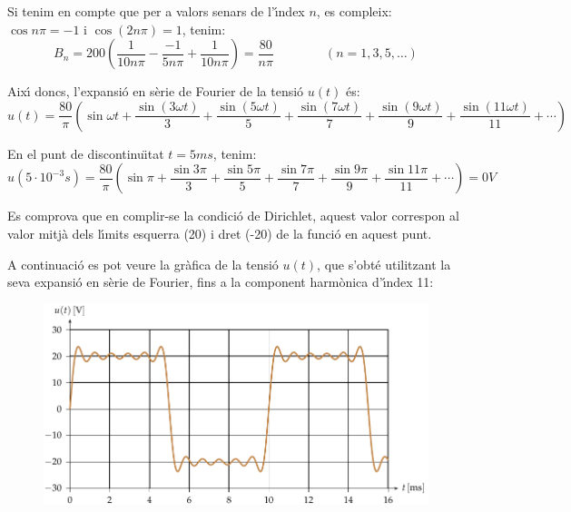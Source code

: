 \begin{exemple}
Si tenim en compte que per a valors senars de l'\'{\i}ndex $n$, es
compleix: $\cos n \pi = -1$ i $\cos (2 n \pi) = 1$, tenim:
\[
    B_n = 200 \left( \frac{1}{10 n \pi} - \frac{-1}{5 n \pi} +
    \frac{1}{10 n \pi} \right) = \frac{80}{n \pi}
    \qquad\qquad(n=1,3,5,\ldots)
\]

Aix\'{\i} doncs, l'expansi\'{o} en s\`{e}rie de Fourier de la tensi\'{o} $u(t)$ \'{e}s:
\[
    u(t) = \frac{80}{\pi} \left( \sin \omega t + \frac{\sin (3 \omega t)}{3} +
    \frac{\sin (5 \omega t)}{5} + \frac{\sin (7 \omega t)}{7} +
    \frac{\sin (9 \omega t)}{9} + \frac{\sin (11 \omega t)}{11} +\cdots\right)
\]

En el punt de discontinu\"{\i}tat $t=5\unit{ms}$, tenim:
\[
    u(5\cdot10^{-3}\unit{s}) =\frac{80}{\pi} \left( \sin \pi + \frac{\sin 3 \pi}{3} +
    \frac{\sin 5 \pi}{5} + \frac{\sin 7 \pi}{7} +
    \frac{\sin 9 \pi}{9} +\frac{\sin 11 \pi}{11}+\cdots\right) = 0\unit{V}
\]

Es comprova que en complir-se la condici\'{o} de Dirichlet, aquest valor
correspon al valor mitj\`{a} dels l\'{\i}mits esquerra (20) i dret (-20)  de
la funci\'{o} en aquest punt.

A continuaci\'{o} es pot veure la gr\`{a}fica de la tensi\'{o} $u(t)$, que
s'obt\'{e} utilitzant la seva expansi\'{o} en s\`{e}rie de Fourier, fins a la
component harm\`{o}nica d'\'{\i}ndex 11:
\begin{figure}[h]
\centering
    \includegraphics{Imatges/Cap-Fourier-Exemple-Tensio.pdf}
\end{figure}


\end{exemple}
